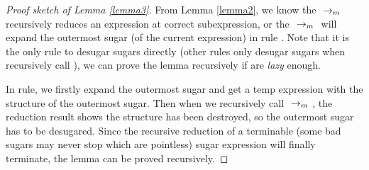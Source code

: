 \begin{proof}[Proof sketch of Lemma \ref{lemma3}]
From Lemma \ref{lemma2}, we know the $~\rightarrow_m~$ recursively reduces an expression at correct subexpression, or the $~\rightarrow_m~$ will expand the outermost sugar (of the current expression) in rule . Note that it is the only rule to desugar sugars directly (other rules only desugar sugars when recursively call ), we can prove the lemma recursively if  are \emph{lazy} enough.

In  rule, we firstly expand the outermost sugar and get a temp expression with the structure of the outermost sugar. Then when we recursively call $~\rightarrow_m~$, the reduction result shows the structure has been destroyed, so the outermost sugar has to be desugared. Since the recursive reduction of a terminable (some bad sugars may never stop which are pointless) sugar expression will finally terminate, the lemma can be proved recursively.
\end{proof}
